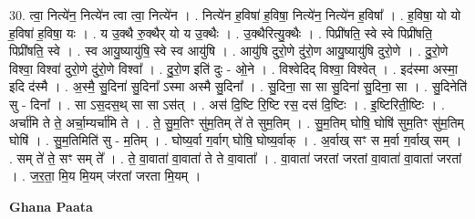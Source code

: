 \documentclass[17pt]{extarticle}
\begin{document}
30. त्वा॒ नित्ये॑न॒ नित्ये॑न त्वा त्वा॒ नित्ये॑न । . नित्ये॑न ह॒विषा॑ ह॒विषा॒ नित्ये॑न॒ नित्ये॑न ह॒विषा᳚ । . ह॒विषा॒ यो यो ह॒विषा॑ ह॒विषा॒ यः । . य उ॒क्थै रु॒क्थैर् यो य उ॒क्थैः । . उ॒क्थैरित्यु॒क्थैः । . पिप्री॑षति॒ स्वे स्वे पिप्री॑षति॒ पिप्री॑षति॒ स्वे । . स्व आयु॒ष्यायु॑षि॒ स्वे स्व आयु॑षि । . आयु॑षि दुरो॒णे दु॑रो॒ण आयु॒ष्यायु॑षि दुरो॒णे । . दु॒रो॒णे विश्वा॒ विश्वा॑ दुरो॒णे दु॑रो॒णे विश्वा᳚ । . दु॒रो॒ण इति॑ दुः - ओ॒ने । . विश्वेदिद् विश्वा॒ विश्वेत् । . इद॑स्मा अस्मा॒ इदि द॑स्मै । . अ॒स्मै॒ सु॒दिना॑ सु॒दिना᳚ ऽस्मा अस्मै सु॒दिना᳚ । . सु॒दिना॒ सा सा सु॒दिना॑ सु॒दिना॒ सा । . सु॒दिनेति॑ सु - दिना᳚ । . सा ऽस॒दस॒थ् सा सा ऽस॑त् । . अस॑ दि॒ष्टि रि॒ष्टि रस॒ दस॑ दि॒ष्टिः । . इ॒ष्टिरिती॒ष्टिः । . अर्चा॑मि ते ते॒ अर्चा॒म्यर्चा॑मि ते । . ते॒ सु॒म॒तिꣳ सु॑म॒तिम् ते॑ ते सुम॒तिम् । . सु॒म॒तिम् घोषि॒ घोषि॑ सुम॒तिꣳ सु॑म॒तिम् घोषि॑ । . सु॒म॒तिमिति॑ सु - म॒तिम् । . घोष्य॒र्वा ग॒र्वाग् घोषि॒ घोष्य॒र्वाक् । . अ॒र्वाख् सꣳ स म॒र्वा ग॒र्वाख् सम् । . सम् ते॑ ते॒ सꣳ सम् ते᳚ । . ते॒ वा॒वाता॑ वा॒वाता॑ ते ते वा॒वाता᳚ । . वा॒वाता॑ जरतां जरतां वा॒वाता॑ वा॒वाता॑ जरतां । . ज॒र॒ता॒ मि॒य मि॒यम् ज॑रतां जरता मि॒यम् । \newline

\textbf{Ghana Paata } \newline
\end{document}
